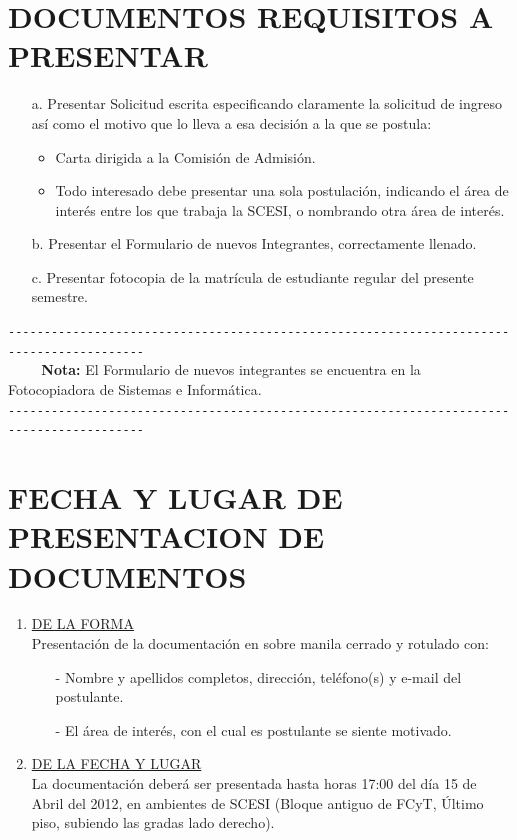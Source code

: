 \documentclass[11pt,letterpaper]{article}
\begin{document}
\section*{\bf \normalsize DOCUMENTOS REQUISITOS A PRESENTAR}
\begin{itemize}
\item[a.] Presentar Solicitud escrita especificando claramente la solicitud de ingreso así como el motivo que lo lleva a esa decisión a la que se postula:
\begin{itemize}
\item Carta dirigida a la Comisión de Admisión.
\item Todo interesado debe presentar una sola postulación, indicando el área de interés entre los que  trabaja la SCESI, o nombrando otra área de interés.
\end{itemize}
\item[b.] Presentar el Formulario de nuevos Integrantes, correctamente llenado.
\item[c.] Presentar fotocopia de la matrícula de estudiante regular del presente semestre.
\end{itemize}
\verb+-----------------------------------------------------------------------------------------+\\
\verb+    + {\bf Nota:} El Formulario de nuevos integrantes se encuentra en la Fotocopiadora de Sistemas e Informática.\\
\verb+-----------------------------------------------------------------------------------------+
\section*{\bf \normalsize FECHA Y LUGAR DE PRESENTACION DE DOCUMENTOS}
\begin{enumerate}
\item \underline{DE LA FORMA}\\
Presentación de la documentación en sobre manila cerrado y rotulado con:
\begin{itemize}
\item[-] Nombre y apellidos completos, dirección, teléfono(s) y e-mail del postulante.
\item[-] El área de interés, con el cual es postulante se siente motivado.
\end{itemize}
\item \underline{DE LA FECHA Y LUGAR}\\
La documentación deberá ser presentada hasta horas 17:00 del día 15 de Abril del 2012, en ambientes de SCESI (Bloque antiguo de FCyT, Último piso, subiendo las gradas lado derecho).
\end{enumerate}
\end{document}
